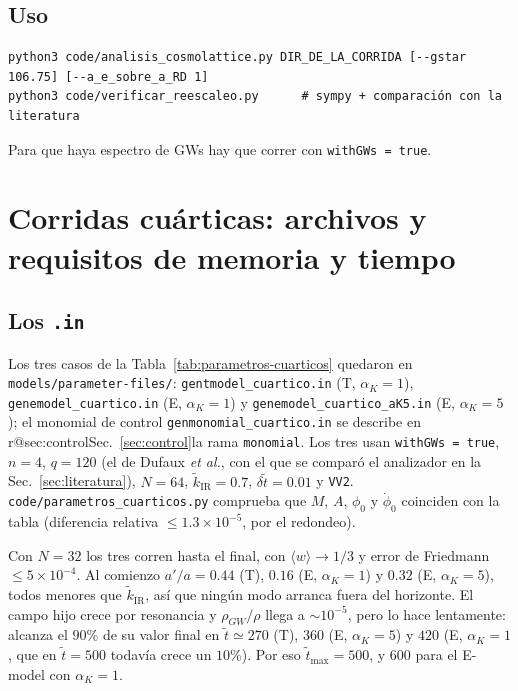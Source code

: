 \documentclass[11pt]{article}
\makeatletter
\newcommand{\reframa}[2]{\ifcsname r@#1\endcsname Sec.~\ref{#1}\else la rama \texttt{#2}\fi}
\makeatother
\begin{document}
        \subsection{Uso}

            {\footnotesize\begin{verbatim}
python3 code/analisis_cosmolattice.py DIR_DE_LA_CORRIDA [--gstar 106.75] [--a_e_sobre_a_RD 1]
python3 code/verificar_reescaleo.py      # sympy + comparación con la literatura
            \end{verbatim}}
            Para que haya espectro de GWs hay que correr con \texttt{withGWs = true}.

    \section{Corridas cuárticas: archivos y requisitos de memoria y tiempo}
        \label{sec:recursos}

        \subsection{Los \texttt{.in}}
            \label{sec:in}

            Los tres casos de la Tabla~\ref{tab:parametros-cuarticos} quedaron en \texttt{models/parameter-files/}: \texttt{gentmodel\_cuartico.in} (T, $\alpha_K = 1$), \texttt{genemodel\_cuartico.in} (E, $\alpha_K = 1$) y \texttt{genemodel\_cuartico\_aK5.in} (E, $\alpha_K = 5$); el monomial de control \texttt{genmonomial\_cuartico.in} se describe en \reframa{sec:control}{monomial}. Los tres usan \texttt{withGWs = true}, $n = 4$, $q = 120$ (el de Dufaux \emph{et al.}, con el que se comparó el analizador en la Sec.~\ref{sec:literatura}), $N = 64$, $\tilde k_{\text{IR}} = 0.7$, $\delta\tilde t = 0.01$ y \texttt{VV2}. \texttt{code/parametros\_cuarticos.py} comprueba que $M$, $A$, $\phi_0$ y $\dot\phi_0$ coinciden con la tabla (diferencia relativa $\le 1.3 \times 10^{-5}$, por el redondeo).

            Con $N = 32$ los tres corren hasta el final, con $\langle w\rangle \to 1/3$ y error de Friedmann $\le 5 \times 10^{-4}$. Al comienzo $a'/a = 0.44$ (T), $0.16$ (E, $\alpha_K = 1$) y $0.32$ (E, $\alpha_K = 5$), todos menores que $\tilde k_{\text{IR}}$, así que ningún modo arranca fuera del horizonte. El campo hijo crece por resonancia y $\rho_{GW}/\rho$ llega a $\sim 10^{-5}$, pero lo hace lentamente: alcanza el $90\%$ de su valor final en $\tilde t \simeq 270$ (T), $360$ (E, $\alpha_K = 5$) y $420$ (E, $\alpha_K = 1$, que en $\tilde t = 500$ todavía crece un $10\%$). Por eso $\tilde t_{\max} = 500$, y $600$ para el E-model con $\alpha_K = 1$.
\end{document}
